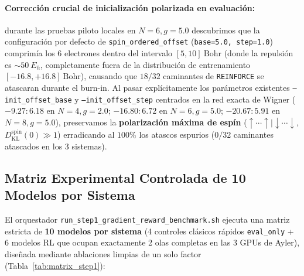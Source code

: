 \documentclass[10pt,a4paper]{article}
\begin{document}
\paragraph{Corrección crucial de inicialización polarizada en evaluación:} durante las pruebas piloto locales en $N=6, g=5.0$ descubrimos que la configuración por defecto de \texttt{spin\_ordered\_offset} (\texttt{base=5.0, step=1.0}) comprimía los 6 electrones dentro del intervalo $[5, 10]\ \mathrm{Bohr}$ (donde la repulsión es $\sim 50\ E_h$, completamente fuera de la distribución de entrenamiento $[-16.8, +16.8]\ \mathrm{Bohr}$), causando que $18/32$ caminantes de \texttt{REINFORCE} se atascaran durante el burn-in. Al pasar explícitamente los parámetros existentes \texttt{--init\_offset\_base} y \texttt{--init\_offset\_step} centrados en la red exacta de Wigner ($-9.27:6.18$ en $N=4, g=2.0$; $-16.80:6.72$ en $N=6, g=5.0$; $-20.67:5.91$ en $N=8, g=5.0$), preservamos la \textbf{polarización máxima de espín} ($\uparrow\cdots\uparrow \mid \downarrow\cdots\downarrow$, $D_{\mathrm{KL}}^{\mathrm{spin}}(0) \gg 1$) erradicando al $100\%$ los atascos espurios ($0/32$ caminantes atascados en los 3 sistemas).

\subsection{Matriz Experimental Controlada de 10 Modelos por Sistema}

El orquestador \texttt{run\_step1\_gradient\_reward\_benchmark.sh} ejecuta una matriz estricta de \textbf{10 modelos por sistema} (4 controles clásicos rápidos \texttt{eval\_only} + 6 modelos RL que ocupan exactamente 2 olas completas en las 3 GPUs de Ayler), diseñada mediante ablaciones limpias de un solo factor (Tabla~\ref{tab:matrix_step1}):
\end{document}
